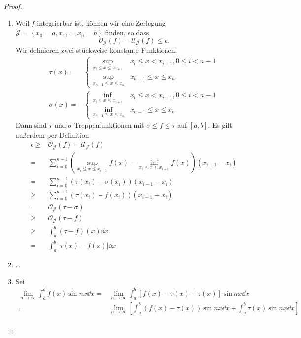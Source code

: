 \begin{proof}
	\begin{enumerate}[label=(\roman*)]
		\item Weil $f$ integrierbar ist, können wir eine Zerlegung $\mathcal{J}=\left\{ x_0=a,x_1,\dots, x_n=b \right\} $ finden, so dass
			\[
				\mathcal{O}_{\mathcal{J}}(f)-\mathcal{U}_{\mathcal{J}}(f)\le \epsilon
			.\] 
			Wir definieren zwei stückweise konstante Funktionen:
			\begin{align*}
				\tau(x)=&\begin{cases}\sup_{x_i \le x \le x_{i+1}} & x_i \le x < x_{i+1}, 0\le i <n-1\\
					\sup_{x_{n-1}\le x \le x_n} & x_{n-1} \le x \le x_n
				\end{cases}\\
				\sigma(x)=&\begin{cases}\inf_{x_i \le x \le x_{i+1}} & x_i \le x < x_{i+1}, 0\le i <n-1\\
					\inf_{x_{n-1}\le x \le x_n} & x_{n-1} \le x \le x_n
					\end{cases}
			\end{align*}
			Dann sind $\tau$ und $\sigma$ Treppenfunktionen mit $\sigma \le f \le \tau$ auf $[a,b]$. Es gilt außerdem per Definition
			\begin{align*}
				\epsilon\ge&\mathcal{O}_{\mathcal{J}}(f)-\mathcal{U}_{\mathcal{J}}(f)\\
				=&\sum_{i=0}^{n-1}\left( \sup_{x_i\le x\le x_{i+1}}f(x)-\inf_{x_i\le x\le x_{i+1}}f(x) \right)(x_{i+1}-x_i) \\
					=&\sum_{i=0}^{n-1}(\tau(x_i)-\sigma(x_i))(x_{i-1}-x_i)\\
					\ge&\sum_{i=0}^{n-1}\left( \tau(x_i)-f(x_i) \right)\left( x_{i+1}-x_i \right) \\
					=&\mathcal{O}_{\mathcal{J}}(\tau-\sigma)\\
					\ge& \mathcal{O}_{\mathcal{J}}(\tau - f)\\
					\ge& \int_a^b (\tau - f)(x)\dd{x}\\
					=&\int_a^b |\tau(x)-f(x)|\dd{x}
			\end{align*}
		\item \ldots
		\item Sei 
			\begin{align*}
				\lim_{n \to \infty} \int_a^b f(x)\sin nx\dd{x}=& \lim_{n \to \infty} \int_a^b \left[ f(x)-\tau(x)+\tau(x) \right] \sin nx\dd{x}\\
				=&\lim_{n \to \infty} \left[ \int_a^b (f(x)-\tau(x))\sin nx\dd{x}+\int_a^b \tau(x)\sin nx\dd{x} \right] \\

\end{align*}
\end{enumerate}
\end{proof}
